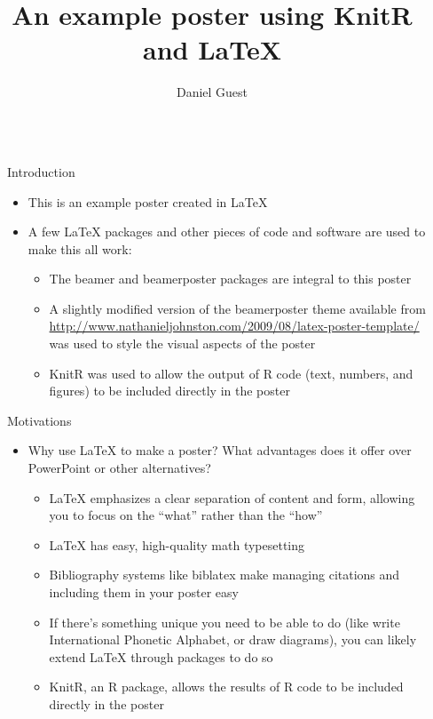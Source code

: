 \documentclass[capfont, final]{beamer}\usepackage[]{graphicx}\usepackage[]{color}
\title{An example poster using KnitR and LaTeX}
\author{Daniel Guest}
\institute{University of Somewhere, Department of Something, One of the Labs}
\newlength{\sepwid}
\newlength{\onecolwid}
\begin{document}
\begin{frame}[t, fragile]
	\begin{columns}[T] %
		\begin{column}{\sepwid}\end{column} %
		\begin{column}{\onecolwid} %
				\begin{block}{Introduction}
						\begin{itemize}
							\item This is an example poster created in \LaTeX{}
							\item A few \LaTeX{} packages and other pieces of code and software are used to make this all work:
							\begin{itemize}
								\item The beamer and beamerposter packages are integral to this poster
								\item A slightly modified version of the beamerposter theme available from \url{http://www.nathanieljohnston.com/2009/08/latex-poster-template/} was used to style the visual aspects of the poster
								\item KnitR was used to allow the output of R code (text, numbers, and figures) to be included directly in the poster
							\end{itemize}
						\end{itemize}
				\end{block}
				\begin{alertblock}{Motivations}
						\begin{itemize}
							\item Why use \LaTeX{} to make a poster? What advantages does it offer over PowerPoint or other alternatives?
								\begin{itemize}
										\item LaTeX{} emphasizes a clear separation of content and form, allowing you to focus on the ``what'' rather than the ``how'' 
										\item LaTeX{} has easy, high-quality math typesetting 
										\item Bibliography systems like biblatex make managing citations and including them in your poster easy
										\item If there's something unique you need to be able to do (like write International Phonetic Alphabet, or draw diagrams), you can likely extend \LaTeX{} through packages to do so
										\item KnitR, an R package, allows the results of R code to be included directly in the poster 

\end{itemize}
\end{itemize}
\end{alertblock}
\end{column}
\end{columns}
\end{frame}
\end{document}
